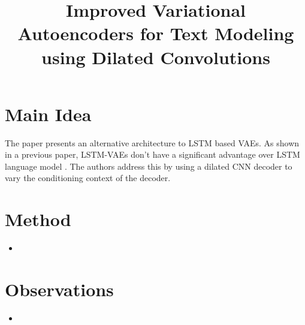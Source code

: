 \documentclass[12pt]{scrartcl}
\begin{document}
\title{Improved Variational Autoencoders for Text Modeling using Dilated Convolutions}
\author{}
\date{}
\maketitle

\section{Main Idea}
  The paper \cite{yang2017improved} presents an alternative architecture to LSTM based VAEs. As shown in a previous paper, LSTM-VAEs don't have a significant advantage over LSTM language model \cite{bowman2016generating}. The authors address this by using a dilated CNN decoder to vary the conditioning context of the decoder. 

\section{Method}
  \begin{itemize}
    \item 
  \end{itemize}

\section{Observations}
  \begin{itemize}
    \item 
  \end{itemize}



\end{document}
